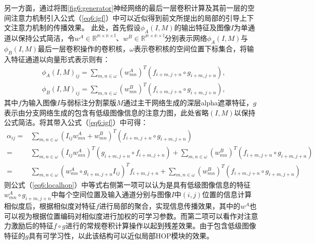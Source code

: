 另一方面，通过将图\ref{fig6:generator}神经网络的最后一层卷积计算及其前一层的空间注意力机制引入公式（\ref{eq6:igf}）中可以近似得到前文所提出的局部的引导上下文注意力机制的传播效果。
此处，首先假设$ \phi_{A}(I, M) $的输出特征及图像$I$为单通道以保持公式简洁，令$w^A\in \mathbb{R^{m\times n\times l}}$、$w^B\in \mathbb{R^{m\times n\times l}}$分别表示网络$ \phi_{A}(I, M) $与$ \phi_{B}(I, M) $最后一层卷积操作的卷积核，$\omega$表示卷积核的空间位置下标集合，将输入特征通道以向量形式表示则有：
\begin{equation}
	\begin{aligned}
	&\phi_{A}(I, M)_{ij} = \sum_{m,n\in \omega} (w^A_{mn})^T(f_{i+m,j+n}\circ g_{i+m,j+n}), \\&\phi_{B}(I, M)_{ij} = \sum_{m,n\in \omega} (w^B_{mn})^T(f_{i+m,j+n}\circ g_{i+m,j+n}),
	\end{aligned}
\end{equation}
其中$f$为输入图像$I$与弱标注分割蒙版$M$通过主干网络生成的深层alpha遮罩特征，$g$表示由分支网络生成的包含有低级图像信息的注意力图，此处省略$(I,M)$以保持公式简洁。将其带入公式（\ref{eq6:igf}）中可得：
\begin{equation}
	\begin{aligned}
	\alpha_{ij} =& \sum_{m,n\in \omega} (I_{ij}w^A_{mn}+w^B_{mn})^T(f_{i+m,j+n}\circ g_{i+m,j+n})\\
	=& \sum_{m,n\in \omega} (I_{ij}w^A_{mn})^T(g_{i+m,j+n}\circ f_{i+m,j+n}) + \sum_{m,n\in \omega} (w^B_{mn})^T(f_{i+m,j+n}\circ g_{i+m,j+n})\\
	=& \sum_{m,n\in \omega} (w^A_{mn}\circ g_{i+m,j+n}I_{ij})^Tf_{i+m,j+n} + \sum_{m,n\in \omega} (w^B_{mn})^T(f_{i+m,j+n}\circ g_{i+m,j+n})
	\end{aligned}
	\label{eq6:localhop}
\end{equation}
则公式（\ref{eq6:localhop}）中等式右侧第一项可以认为是具有低级图像信息的特征$w^A_{mn}\circ g_{i+m,j+n}$中每个空间位置及输入通道分别与图像$I$中$(i,j)$位置的信息计算相似度后，根据相似度对特征$f$进行局部的聚合，实现信息传播效果，其中的$w^A$也可以视为根据位置编码对相似度进行加权的可学习参数。而第二项可以看作对注意力激励后的特征$f\circ g$进行的常规卷积计算操作以起到残差效果。由于包含低级图像特征的$g$具有可学习性，以此该结构可以近似局部HOP模块的效果。

